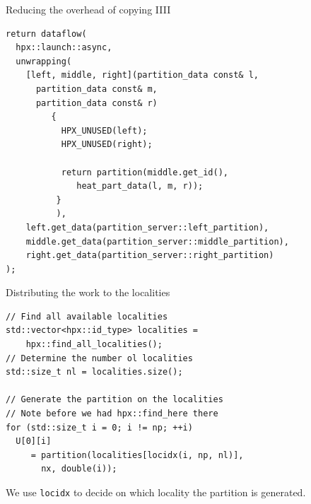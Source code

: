 \documentclass[\classoption]{beamer}
\begin{document}
\begin{frame}[fragile]{Reducing the overhead of copying IIII}

\begin{lstlisting}
return dataflow(
  hpx::launch::async,
  unwrapping(
    [left, middle, right](partition_data const& l, 
      partition_data const& m,
      partition_data const& r)
         {
           HPX_UNUSED(left);
           HPX_UNUSED(right);

           return partition(middle.get_id(), 
              heat_part_data(l, m, r));
          }
          ),
    left.get_data(partition_server::left_partition),
    middle.get_data(partition_server::middle_partition),
    right.get_data(partition_server::right_partition)
);
\end{lstlisting}

\end{frame}

\begin{frame}[fragile]{Distributing the work to the localities}

\begin{lstlisting}
// Find all available localities
std::vector<hpx::id_type> localities = 
	hpx::find_all_localities();
// Determine the number ol localities
std::size_t nl = localities.size(); 

// Generate the partition on the localities
// Note before we had hpx::find_here there
for (std::size_t i = 0; i != np; ++i)
  U[0][i] 
     = partition(localities[locidx(i, np, nl)], 
       nx, double(i));
\end{lstlisting}

We use \lstinline|locidx| to decide on which locality the partition is generated.
\end{frame}
\end{document}

